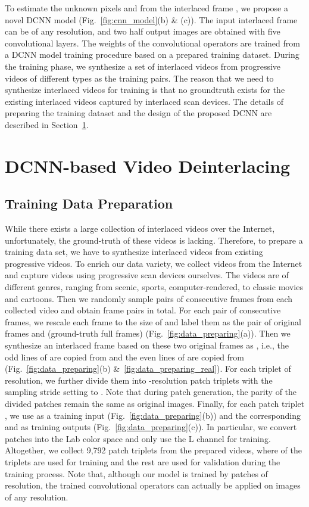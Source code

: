 \documentclass[acmtog]{acmart}
\begin{document}
To estimate the unknown pixels  and
 from the interlaced frame , we
propose a novel DCNN model (Fig.~\ref{fig:cnn_model}(b) \& (c)). The input
interlaced frame can be of any resolution, and two half output images are
obtained with five convolutional layers. The weights of the convolutional
operators are trained from a DCNN model training procedure based on a prepared
training dataset. During the training phase, we synthesize a set of interlaced
videos from progressive videos of different types as the training pairs. The
reason that we need to synthesize interlaced videos for training is that no
groundtruth exists for the existing interlaced videos captured by interlaced
scan devices. The details of preparing the training dataset and the design
of the proposed DCNN are described in Section~\ref{sec:deinterlacing}.  \section{DCNN-based Video Deinterlacing}\label{sec:deinterlacing}
\subsection{Training Data Preparation}

While there exists a large collection of interlaced videos over the Internet,
unfortunately, the ground-truth of these videos is lacking. Therefore, to
prepare a training data set, we have to synthesize
interlaced videos from existing progressive videos. To enrich our data variety, we
collect  videos from the Internet and capture  videos using progressive
scan devices ourselves. The videos are of different genres, ranging from 
scenic, sports, computer-rendered, to classic movies and cartoons. Then we randomly sample  pairs of consecutive frames from each collected
video and obtain  frame pairs in total. For each pair of consecutive
frames, we rescale each frame to the size of  and label them as the
pair of original frames  and  (ground-truth full frames)
(Fig.~\ref{fig:data_preparing}(a)). Then we synthesize an interlaced frame based
on these two original frames as
, i.e.,
the odd lines of  are copied from  and the even lines
of  are copied from 
(Fig.~\ref{fig:data_preparing}(b) \&~\ref{fig:data_preparing_real}). For
each triplet  of  resolution, we further divide
them into -resolution patch triplets  with the sampling stride
setting to .  Note that during patch generation, the parity of the divided
patches remain the same as original images. Finally, for each patch triplet
, we use  as a training input
(Fig.~\ref{fig:data_preparing}(b)) and the corresponding
 and  as
training outputs (Fig.~\ref{fig:data_preparing}(c)). In particular, we convert
patches into the Lab color space and only use the L channel for training. Altogether, we
collect 9,792 patch triplets from the prepared videos, where  of
the triplets are used for training and the rest are used for validation during
the training process. Note that, although our model is trained by patches of
 resolution, the trained convolutional operators can actually be
applied on images of any resolution.
\end{document}
